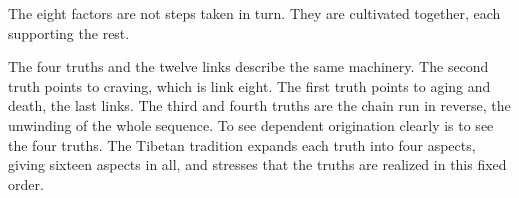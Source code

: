 The eight factors are not steps taken in turn. They are cultivated together, each supporting the rest.

The four truths and the twelve links describe the same machinery. The second truth points to craving, which is link eight. The first truth points to aging and death, the last links. The third and fourth truths are the chain run in reverse, the unwinding of the whole sequence. To see dependent origination clearly is to see the four truths. The Tibetan tradition expands each truth into four aspects, giving sixteen aspects in all, and stresses that the truths are realized in this fixed order.
